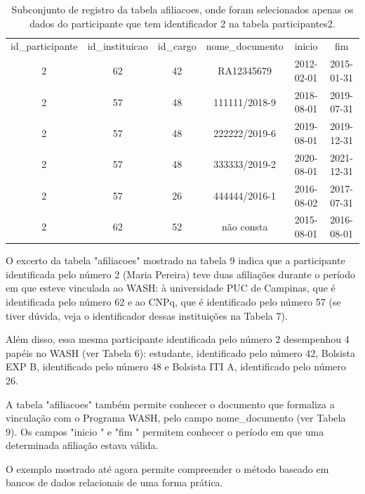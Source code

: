 \begin{table}[htb]
\tiny
\caption{\label{22b8f800790bcad960b91cc2a9e7f073a4a20b8f}Subconjunto de registro da tabela afiliacoes, onde foram selecionados apenas os dados do participante que tem identificador 2 na tabela participantes2.}

\centering
\begin{tabular}{|c|c|c|c|c|c|}
\hline
id\_participante  &  id\_instituicao  &  id\_cargo  &  nome\_documento  &  inicio      &  fim \\
              2  &              62  &        42  &  RA12345679      &  2012-02-01  &  2015-01-31  \\
              2  &              57  &        48  &  111111/2018-9   &  2018-08-01  &  2019-07-31  \\
              2  &              57  &        48  &  222222/2019-6   &  2019-08-01  &  2019-12-31  \\
              2  &              57  &        48  &  333333/2019-2   &  2020-08-01  &  2021-12-31  \\
              2  &              57  &        26  &  444444/2016-1   &  2016-08-02  &  2017-07-31  \\
              2  &              62  &        52  &  não consta      &  2015-08-01  &  2016-08-01 \\
\hline
\end{tabular}
\end{table}


O excerto da tabela "afiliacoes" mostrado na tabela 9 indica que a participante identificada pelo número 2 (Maria Pereira)  teve duas afiliações durante o período em que esteve vinculada ao WASH: à universidade PUC de Campinas, que é identificada pelo número 62 e ao CNPq, que é identificado pelo número 57 (se tiver dúvida, veja o identificador dessas instituições na Tabela 7).

Além disso, essa mesma participante identificada pelo número 2 desempenhou 4 papéis no WASH (ver Tabela 6): estudante, identificado pelo número 42, Bolsista EXP B, identificado pelo número 48 e Bolsista ITI A, identificado pelo número 26.

A tabela "afiliacoes" também permite conhecer o documento que formaliza a vinculação com o Programa WASH, pelo campo nome\_documento (ver Tabela 9). Os campos "inicio " e "fim " permitem conhecer o período em que uma determinada afiliação estava válida.

O exemplo mostrado até agora permite compreender o método baseado em bancos de dados relacionais de uma forma prática.


